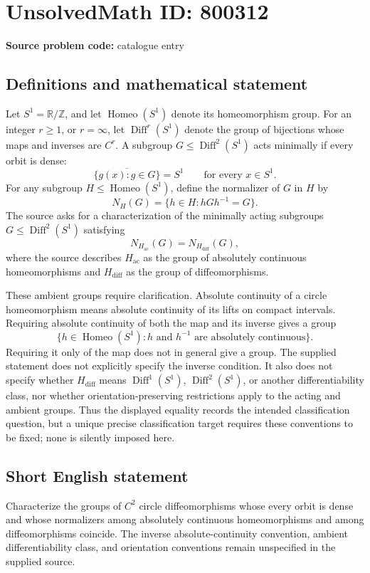 \documentclass[11pt]{article}
\newcommand{\Z}{\mathbb{Z}}
\newcommand{\R}{\mathbb{R}}
\begin{document}
\section*{UnsolvedMath ID: 800312}
\textbf{Source problem code:} catalogue entry
\subsection{Definitions and mathematical statement}
Let \(S^1=\R/\Z\), and let \(\operatorname{Homeo}(S^1)\) denote its homeomorphism group. For an integer \(r\geq 1\), or \(r=\infty\), let \(\operatorname{Diff}^r(S^1)\) denote the group of bijections whose maps and inverses are \(C^r\). A subgroup \(G\leq\operatorname{Diff}^2(S^1)\) acts minimally if every orbit is dense:
\[
\overline{\{g(x):g\in G\}}=S^1\qquad\text{for every }x\in S^1.
\]
For any subgroup \(H\leq\operatorname{Homeo}(S^1)\), define the normalizer of \(G\) in \(H\) by
\[
N_H(G)=\{h\in H:hGh^{-1}=G\}.
\]
The source asks for a characterization of the minimally acting subgroups \(G\leq\operatorname{Diff}^2(S^1)\) satisfying
\[
N_{H_{\mathrm{ac}}}(G)=N_{H_{\mathrm{diff}}}(G),
\]
where the source describes \(H_{\mathrm{ac}}\) as the group of absolutely continuous homeomorphisms and \(H_{\mathrm{diff}}\) as the group of diffeomorphisms.

These ambient groups require clarification. Absolute continuity of a circle homeomorphism means absolute continuity of its lifts on compact intervals. Requiring absolute continuity of both the map and its inverse gives a group
\[
\{h\in\operatorname{Homeo}(S^1):h\text{ and }h^{-1}\text{ are absolutely continuous}\}.
\]
Requiring it only of the map does not in general give a group. The supplied statement does not explicitly specify the inverse condition. It also does not specify whether \(H_{\mathrm{diff}}\) means \(\operatorname{Diff}^1(S^1)\), \(\operatorname{Diff}^2(S^1)\), or another differentiability class, nor whether orientation-preserving restrictions apply to the acting and ambient groups. Thus the displayed equality records the intended classification question, but a unique precise classification target requires these conventions to be fixed; none is silently imposed here.
\subsection{Short English statement}
Characterize the groups of \(C^2\) circle diffeomorphisms whose every orbit is dense and whose normalizers among absolutely continuous homeomorphisms and among diffeomorphisms coincide. The inverse absolute-continuity convention, ambient differentiability class, and orientation conventions remain unspecified in the supplied source.
\end{document}
